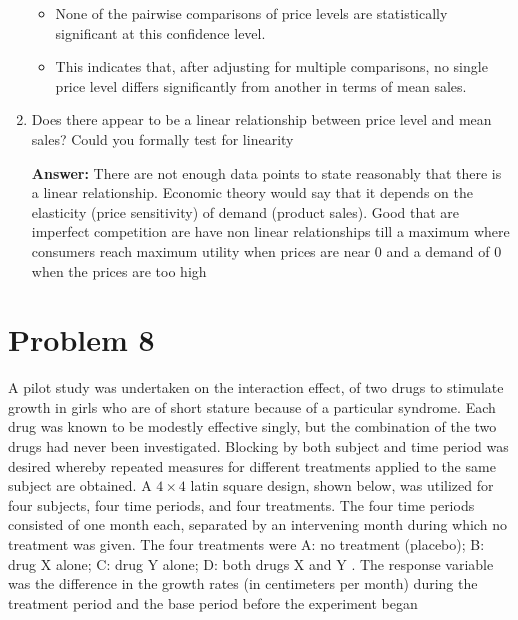 \documentclass{article}
\begin{document}
\begin{enumerate}
\begin{table}[h!]
\begin{tabular}{lcccccc}
			      \bottomrule
		      \end{tabular}
	      \end{table}
	      \begin{itemize}
		      \item None of the pairwise comparisons of price levels are statistically significant at this confidence level.
		      \item This indicates that, after adjusting for multiple comparisons, no single price level differs significantly from another in terms of mean sales.
	      \end{itemize}
	\item Does there appear to be a linear relationship between price level and mean sales? Could you formally test for linearity

	      \textbf{Answer:} There are not enough data points to state reasonably that there is a linear relationship. Economic theory would say that it depends on the
	      elasticity (price sensitivity) of demand (product sales). Good that are imperfect competition are have non linear relationships till a maximum where consumers
	      reach maximum utility when prices are near 0 and a demand of 0 when the prices are too high
\end{enumerate}

\section{Problem 8}
A pilot study was undertaken on the interaction effect, of two drugs to stimulate growth in girls
who are of short stature because of a particular syndrome. Each drug was known to be modestly
effective singly, but the combination of the two drugs had never been investigated. Blocking by both
subject and time period was desired whereby repeated measures for different treatments applied
to the same subject are obtained. A $4 \times 4$ latin square design, shown below, was utilized for four
subjects, four time periods, and four treatments. The four time periods consisted of one month
each, separated by an intervening month during which no treatment was given. The four treatments
were A: no treatment (placebo); B: drug X alone; C: drug Y alone; D: both drugs X and Y .
The response variable was the difference in the growth rates (in centimeters per month) during the
treatment period and the base period before the experiment began
\end{document}
